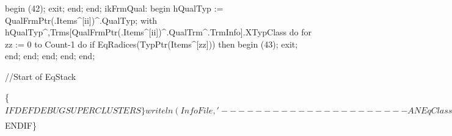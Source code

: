                      begin
                        (42);
                        exit;
                     end;
               end;
            ikFrmQual:
               begin hQualTyp := QualFrmPtr(.Items^[ii])^.QualTyp;
               with hQualTyp^,Trms[QualFrmPtr(.Items^[ii])^.QualTrm^.TrmInfo].XTypClass do
                                 for zz := 0 to Count-1 do
                                    if EqRadices(TypPtr(Items^[zz])) then
                                    begin
                                       (43);
                                       exit;
                                    end;
               end;
         end;
      end;
   end;
   
   //Start of EqStack

   \{$IFDEF DEBUGSUPERCLUSTERS\}
   writeln(InfoFile,'---------------------- ANEqClasses:');
   infoeqclasses;
   writeln(InfoFile,'---------------------- ');
   infonewline;writeln(infofile,'CCLUSTERS:',ConditionalCluster.Count);
   for ANj := 0 to ConditionalCluster.Count-1 do
   begin
      infonewline;writeln(infofile,'(',anj,'):');
      infostring('ante:');infocluster(cclusterptr(conditionalcluster.items^[anj])^.nantecedent);infonewline;
      infostring('cons:');infocluster(cclusterptr(conditionalcluster.items^[anj])^.nconsequent.upper);infonewline;
      infostring('type:');infotype(cclusterptr(conditionalcluster.items^[anj])^.nclustertype);infonewline;
      infostring('prim:');infotypecoll(cclusterptr(conditionalcluster.items^[anj])^.nprimarylist);infonewline;
   end;
   infonewline;writeln(infofile,'FCLUSTERS:',FunctorCluster.Count);
   for ANj := 0 to FunctorCluster.Count-1 do
   begin
      infonewline;writeln(infofile,'(',anj,'):');
      infostring('cons:');infocluster(fclusterptr(functorcluster.items^[anj])^.nconsequent.upper);infonewline;
      infostring('type:');if fclusterptr(functorcluster.items^[anj])^.nclustertype <> nil then infotype(fclusterptr(functorcluster.items^[anj])^.nclustertype) else write(infofile,'NIL type');infonewline;
      infostring('term:');infoterm(fclusterptr(functorcluster.items^[anj])^.nclusterterm);infonewline;
      infostring('prim:');infotypecoll(fclusterptr(functorcluster.items^[anj])^.nprimarylist);infonewline;
   end;
   \{$ENDIF\}
   
